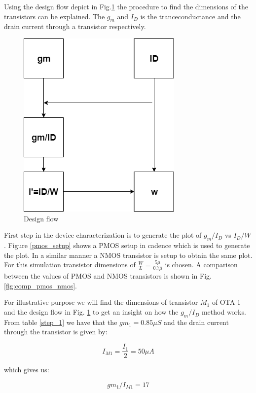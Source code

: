 Using the design flow depict in Fig.\ref{design_slow} the procedure to find the dimensions of the transistors can be explained. The $g_m$ and $I_D$ is the tranceconductance and the drain current through a transistor respectively. 

\begin{figure}[H]
\centering
\includegraphics[scale = 0.45]{images/design_flow.png}
\caption{Design flow}
\label{design_slow}
\end{figure}

First step in the device characterization is to generate the plot of $g_m/I_D$ vs $I_D/W$. Figure
\ref{pmos_setup} shows a PMOS setup in cadence which is used to generate the plot. In a similar manner a NMOS transistor is setup to obtain the same plot. For this simulation transistor dimensions of $\frac{W}{L} = \frac{5\mu}{0.7\mu}$ is chosen. A comparison between the values of PMOS and NMOS transistors is shown in Fig. \ref{fig:comp_pmos_nmos}.

For illustrative purpose we will find the dimensions of transistor $M_1$ of OTA 1 and the design flow in Fig. \ref{design_slow} to get an insight on how the $g_m/I_D$ method works. From table \ref{step_1} we have that the $gm_1 = 0.85\mu S$ and the drain current through the transistor is given by:

\begin{equation}
    I_{M1} = \frac{I_1}{2} = 50\mu A
\end{equation}

which gives us:

\begin{equation}\label{gm_ID}
   gm_1/I_{M1} = 17 
\end{equation}



